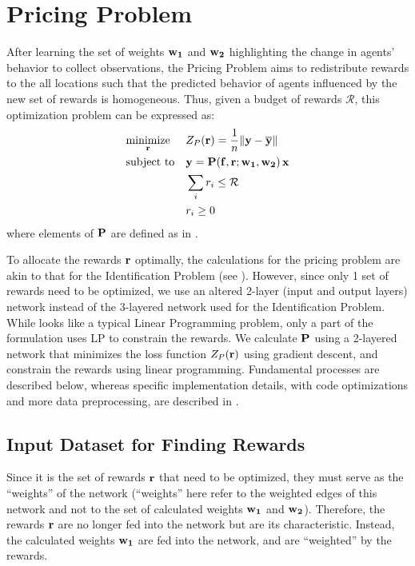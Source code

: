 \section{Pricing Problem} \label{sec:Pricing Problem}
After learning the set of weights $\mathbf{w_1}$ and $\mathbf{w_2}$ highlighting the change in agents' behavior to collect observations, the Pricing Problem aims to redistribute rewards to the all locations such that the predicted behavior of agents influenced by the new set of rewards is homogeneous. Thus, given a budget of rewards $\mathcal{R}$, this optimization problem can be expressed as:
\begin{equation} \label{eqn:pricing_problem}
    \begin{aligned}
        & \underset{\mathbf{r}}{\text{minimize}}
        & & Z_P(\mathbf{r}) = \frac{1}{n}\lVert \mathbf{y} - \overline{\mathbf{y}} \rVert\\
        & \text{subject to}
        & & \mathbf{y} = \mathbf{P}(\mathbf{f}, \mathbf{r}; \mathbf{w_1}, \mathbf{w_2}) \, \mathbf{x}\\
        &&& \sum_{i} r_i \leq \mathcal{R}\\
        &&& r_i \geq 0
    \end{aligned}
\end{equation}
where elements of $\mathbf{P}$ are defined as in .

To allocate the rewards $\mathbf{r}$ optimally, the calculations for the pricing problem are akin to that for the Identification Problem (see ). However, since only 1 set of rewards need to be optimized, we use an altered 2-layer (input and output layers) network instead of the 3-layered network used for the Identification Problem. While  looks like a typical Linear Programming problem, only a part of the formulation uses LP to constrain the rewards. We calculate $\mathbf{P}$ using a 2-layered network that minimizes the loss function $Z_P(\mathbf{r})$ using gradient descent, and constrain the rewards using linear programming. Fundamental processes are described below, whereas specific implementation details, with code optimizations and more data preprocessing, are described in .

\subsection{Input Dataset for Finding Rewards}
Since it is the set of rewards $\mathbf{r}$ that need to be optimized, they must serve as the ``weights'' of the network (``weights'' here refer to the weighted edges of this network and not to the set of calculated weights $\mathbf{w_1}$ and $\mathbf{w_2}$). Therefore, the rewards $\mathbf{r}$ are no longer fed into the network but are its characteristic. Instead, the calculated weights $\mathbf{w_1}$ are fed into the network, and are ``weighted'' by the rewards.

